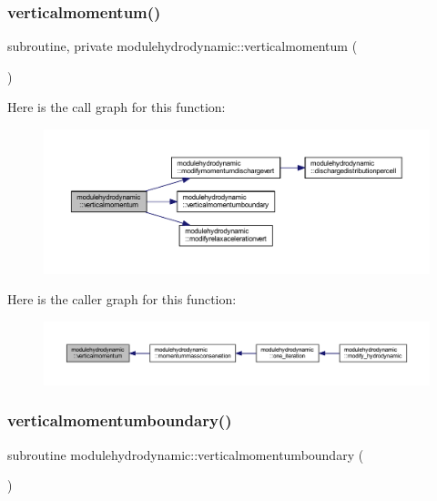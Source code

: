 \subsubsection{\texorpdfstring{verticalmomentum()}{verticalmomentum()}}
{\footnotesize\ttfamily subroutine, private modulehydrodynamic\+::verticalmomentum (\begin{DoxyParamCaption}{ }\end{DoxyParamCaption})\hspace{0.3cm}{\ttfamily [private]}}

Here is the call graph for this function\+:\nopagebreak
\begin{figure}[H]
\begin{center}
\leavevmode
\includegraphics[width=350pt]{namespacemodulehydrodynamic_aa70939d9e325f64455a339e7369d5b4c_cgraph}
\end{center}
\end{figure}
Here is the caller graph for this function\+:\nopagebreak
\begin{figure}[H]
\begin{center}
\leavevmode
\includegraphics[width=350pt]{namespacemodulehydrodynamic_aa70939d9e325f64455a339e7369d5b4c_icgraph}
\end{center}
\end{figure}
\mbox{\label{namespacemodulehydrodynamic_a7b6e382d0318b7799ad5228e8148e1ac}} 
\subsubsection{\texorpdfstring{verticalmomentumboundary()}{verticalmomentumboundary()}}
{\footnotesize\ttfamily subroutine modulehydrodynamic\+::verticalmomentumboundary (\begin{DoxyParamCaption}{ }\end{DoxyParamCaption})\hspace{0.3cm}{\ttfamily [private]}}

